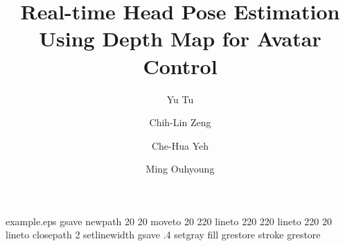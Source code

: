 %
%
%
%
%
\begin{filecontents*}{example.eps}
gsave
newpath
  20 20 moveto
  20 220 lineto
  220 220 lineto
  220 20 lineto
closepath
2 setlinewidth
gsave
  .4 setgray fill
grestore
stroke
grestore
\end{filecontents*}
%
\RequirePackage{fix-cm}
%

\documentclass[twocolumn]{svjour3}          %
%
\smartqed  %
%
\usepackage{graphicx}
\usepackage{amsmath}
%
%
%
%
%


\title{Real-time Head Pose Estimation Using Depth Map for Avatar Control%
}


\author{Yu Tu         \and
        Chih-Lin Zeng \and
        Che-Hua Yeh   \and
        Ming Ouhyoung
}


